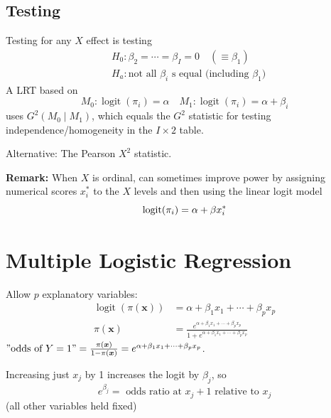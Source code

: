 \documentclass[11pt]{elegantbook}
\begin{document}
\subsection{Testing}
Testing for any $X$ effect is testing
$$
\begin{aligned}
& H_0: \beta_2=\cdots=\beta_I=0 \quad\left(\equiv \beta_1\right) \\
& H_a: \text {not all } \beta_i \text { s equal (including $\beta_1$)}
\end{aligned}
$$
A LRT based on
$$
M_0: \operatorname{logit}\left(\pi_i\right)=\alpha \quad M_1: \operatorname{logit}\left(\pi_i\right)=\alpha+\beta_i
$$
uses $G^2\left(M_0 \mid M_1\right)$, which equals the $G^2$ statistic for testing independence/homogeneity in the $I \times 2$ table.

Alternative: The Pearson $X^2$ statistic.

\textbf{Remark:} When $X$ is ordinal, can sometimes improve power by assigning numerical scores $x_i^*$ to the $X$ levels and then using the linear logit model $$\textnormal{logit}(\pi_i)=\alpha+\beta x_i^*$$

\section{Multiple Logistic Regression}
Allow $p$ explanatory variables:
\begin{equation}
    \begin{aligned}
        \operatorname{logit}(\pi(\boldsymbol{x}))&=\alpha+\beta_1 x_1+\cdots+\beta_p x_p\\
        \pi(\boldsymbol{x})&=\frac{e^{\alpha+\beta_1 x_1+\cdots+\beta_p x_p}}{1+e^{\alpha+\beta_1 x_1+\cdots+\beta_p x_p}}
    \end{aligned}
    \nonumber
\end{equation}
$"\text{odds of } Y=1"=\frac{\pi(\boldsymbol{x})}{1-\pi(\boldsymbol{x})}=e^{\alpha+\beta_1 x_1+\cdots+\beta_p x_p}$.

Increasing just $x_j$ by 1 increases the logit by $\beta_j$, so
$$
e^{\beta_j}=\text { odds ratio at } x_j+1 \text { relative to } x_j
$$
(all other variables held fixed)
\end{document}
